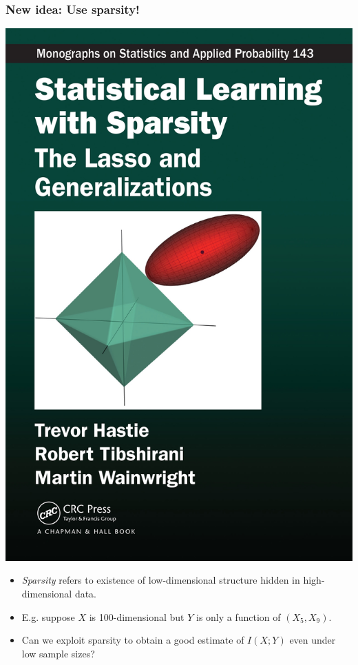 \documentclass{beamer}
\begin{document}
\begin{frame}
\frametitle{New idea: Use sparsity!}
\begin{center}
\includegraphics[scale = 0.05]{sls.jpg}
\end{center}
\begin{itemize}
\item \emph{Sparsity} refers to existence of low-dimensional structure hidden in high-dimensional data.\pause
\item E.g. suppose $X$ is 100-dimensional but $Y$ is only a function of $(X_5, X_9)$.\pause
\item Can we exploit sparsity to obtain a good estimate of $I(X; Y)$ even under low sample sizes?
\end{itemize}
\end{frame}
\end{document}
